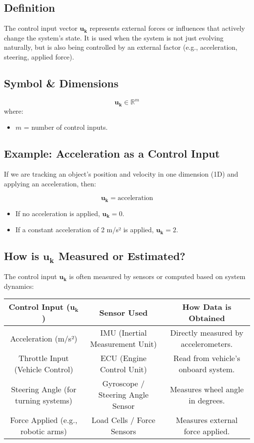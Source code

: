 \documentclass{article}
\begin{document}
\subsection*{Definition}
The control input vector \(\mathbf{u_k}\) represents external forces or influences that actively change the system’s state.
It is used when the system is not just evolving naturally, but is also being controlled by an external factor (e.g., acceleration, steering, applied force).

\subsection*{Symbol \& Dimensions}
\[
\mathbf{u_k} \in \mathbb{R}^m
\]
where:
\begin{itemize}
    \item \(m\) = number of control inputs.
\end{itemize}

\subsection*{Example: Acceleration as a Control Input}
If we are tracking an object’s position and velocity in one dimension (1D) and applying an acceleration, then:

\[
\mathbf{u_k} = \text{acceleration}
\]

\begin{itemize}
    \item If no acceleration is applied, \(\mathbf{u_k} = 0\).
    \item If a constant acceleration of 2 m/s² is applied, \(\mathbf{u_k} = 2\).
\end{itemize}

\subsection*{How is \(\mathbf{u_k}\) Measured or Estimated?}
The control input \(\mathbf{u_k}\) is often measured by sensors or computed based on system dynamics:

\begin{table}[h]
    \centering
    \begin{tabular}{|c|c|c|}
        \hline
        \textbf{Control Input (\(\mathbf{u_k}\))} & \textbf{Sensor Used} & \textbf{How Data is Obtained} \\
        \hline
        Acceleration (m/s²) & IMU (Inertial Measurement Unit) & Directly measured by accelerometers. \\
        Throttle Input (Vehicle Control) & ECU (Engine Control Unit) & Read from vehicle's onboard system. \\
        Steering Angle (for turning systems) & Gyroscope / Steering Angle Sensor & Measures wheel angle in degrees. \\
        Force Applied (e.g., robotic arms) & Load Cells / Force Sensors & Measures external force applied. \\
        \hline
    \end{tabular}
\end{table}
\end{document}

